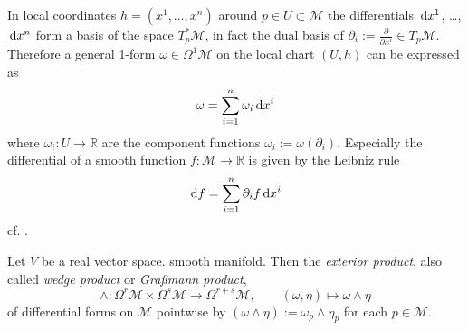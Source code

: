 In local coordinates $h = (x^1, \ldots, x^n)$ around $p \in U \subset \mathscr{M}$ the differentials $\,\mathrm{d} x^1$, \ldots, $\,\mathrm{d} x^n$ form a basis of the space $T_p^* \mathscr{M}$, in fact the dual basis of $\partial_i := \frac{\partial}{\partial x^i} \in T_p \mathscr{M}$.
Therefore a general 1-form $\omega \in \Omega^1 \mathscr{M}$ on the local chart $(U,h)$ can be expressed as
\begin{equation}
	\omega = \sum_{i=1}^{n} \omega_i \,\mathrm{d} x^i
\end{equation}
where $\omega_i: U \to \mathbb{R}$ are the component functions $\omega_i := \omega(\partial_i)$.
Especially the differential of a smooth function $f:\mathscr{M} \to \mathbb{R}$ is given by 
the Leibniz rule
\begin{equation}
	\,\mathrm{d} f = \sum_{i=1}^{n} \partial_i f \,\mathrm{d} x^i
\end{equation}
cf. \cite[61]{Jaenich-1992}.

\begin{definition}
	\cites[196]{Choquet-Bruhat-et-al-1982}[135]{Jaenich-1992}
	Let $V$ be a real vector space. smooth manifold. Then the 
	\emph{exterior product},
	also called \emph{wedge product}
	or \emph{Graßmann product},
	\begin{equation}
		\wedge: \Omega^r \mathscr{M} \times \Omega^s \mathscr{M} \to \Omega^{r+s} \mathscr{M},
		\qquad
		(\omega, \eta) \mapsto \omega \wedge \eta
	\end{equation}
	of differential forms on $\mathscr{M}$ pointwise by $(\omega \wedge \eta) := \omega_p \wedge \eta_p$ for each $p \in \mathscr{M}$.
\end{definition}

